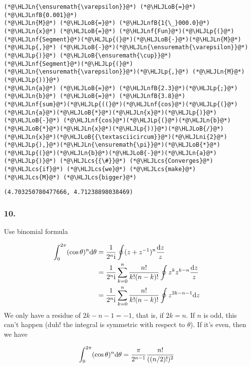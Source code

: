\documentclass[12pt,a4paper]{article}
\newcommand{\HLJLn}[1]{#1}
\newcommand{\HLJLnf}[1]{\textcolor[RGB]{66,102,213}{#1}}
\newcommand{\HLJLnfB}[1]{\textcolor[RGB]{59,151,46}{#1}}
\newcommand{\HLJLni}[1]{\textcolor[RGB]{59,151,46}{#1}}
\newcommand{\HLJLoB}[1]{\textcolor[RGB]{102,102,102}{\textbf{#1}}}
\newcommand{\HLJLp}[1]{#1}
\newcommand{\HLJLcs}[1]{\textcolor[RGB]{153,153,119}{\textit{#1}}}
\def\D{ {\rm d} }
\def\I{ {\rm i} }
\def\dz{\D z}
\begin{document}
\begin{lstlisting}
(*@\HLJLn{\ensuremath{\varepsilon}}@*) (*@\HLJLoB{=}@*)(*@\HLJLnfB{0.001}@*)
(*@\HLJLn{M}@*) (*@\HLJLoB{=}@*) (*@\HLJLnfB{1{\_}000.0}@*)
(*@\HLJLn{x}@*) (*@\HLJLoB{=}@*) (*@\HLJLnf{Fun}@*)(*@\HLJLp{(}@*)(*@\HLJLnf{Segment}@*)(*@\HLJLp{(}@*)(*@\HLJLoB{-}@*)(*@\HLJLn{M}@*) (*@\HLJLp{,}@*) (*@\HLJLoB{-}@*)(*@\HLJLn{\ensuremath{\varepsilon}}@*)(*@\HLJLp{)}@*) (*@\HLJLoB{\ensuremath{\cup}}@*) (*@\HLJLnf{Segment}@*)(*@\HLJLp{(}@*)(*@\HLJLn{\ensuremath{\varepsilon}}@*)(*@\HLJLp{,}@*) (*@\HLJLn{M}@*)(*@\HLJLp{))}@*)
(*@\HLJLn{a}@*) (*@\HLJLoB{=}@*) (*@\HLJLnfB{2.3}@*)(*@\HLJLp{;}@*) (*@\HLJLn{b}@*) (*@\HLJLoB{=}@*) (*@\HLJLnfB{3.8}@*)
(*@\HLJLnf{sum}@*)(*@\HLJLp{((}@*)(*@\HLJLnf{cos}@*)(*@\HLJLp{(}@*)(*@\HLJLn{a}@*)(*@\HLJLoB{*}@*)(*@\HLJLn{x}@*)(*@\HLJLp{)}@*) (*@\HLJLoB{-}@*) (*@\HLJLnf{cos}@*)(*@\HLJLp{(}@*)(*@\HLJLn{b}@*)(*@\HLJLoB{*}@*)(*@\HLJLn{x}@*)(*@\HLJLp{))}@*)(*@\HLJLoB{/}@*)(*@\HLJLn{x}@*)(*@\HLJLoB{{\textasciicircum}}@*)(*@\HLJLni{2}@*)(*@\HLJLp{),}@*)(*@\HLJLn{\ensuremath{\pi}}@*)(*@\HLJLoB{*}@*)(*@\HLJLp{(}@*)(*@\HLJLn{b}@*)(*@\HLJLoB{-}@*)(*@\HLJLn{a}@*)(*@\HLJLp{)}@*) (*@\HLJLcs{{\#}}@*) (*@\HLJLcs{Converges}@*) (*@\HLJLcs{if}@*) (*@\HLJLcs{we}@*) (*@\HLJLcs{make}@*) (*@\HLJLcs{M}@*) (*@\HLJLcs{bigger}@*)
\end{lstlisting}

\begin{lstlisting}
(4.703250780477666, 4.71238898038469)
\end{lstlisting}


\subsubsection{10.}
Use binomial formula


\begin{align*}
\int_0^{2 \pi} (\cos \theta)^n \D \theta &= {1 \over 2^n \I} \oint (z+z^{-1})^n {\dz \over z} \\
 &=  {1 \over 2^n \I} \sum_{k=0}^n {n! \over k! (n-k)!} \oint z^k z^{k-n} {\dz \over z} \\
 &=  {1 \over 2^n \I} \sum_{k=0}^n {n! \over k! (n-k)!} \oint z^{2k-n-1}\dz
\end{align*}
We only have a residue of $2k-n-1 = -1$, that is, if $2k = n$. If $n$ is odd, this can't happen (duh! the integral is symmetric with respect to $\theta$). If it's even, then we have

\[
\int_0^{2 \pi} (\cos \theta)^n \D \theta =  {\pi \over 2^{n-1} }  {n! \over  ((n/2)!)^2}
\]
\end{document}
